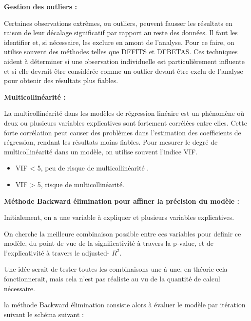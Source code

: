 \documentclass[
  letterpaper,
  DIV=11,
  numbers=noendperiod]{scrartcl}
\begin{document}
\textbf{Gestion des outliers :}

Certaines observations extrêmes, ou outliers, peuvent fausser les
résultats en raison de leur décalage significatif par rapport au reste
des données. Il faut les identifier et, si nécessaire, les exclure en
amont de l'analyse. Pour ce faire, on utilise souvent des méthodes
telles que DFFITS et DFBETAS. Ces techniques aident à déterminer si une
observation individuelle est particulièrement influente et si elle
devrait être considérée comme un outlier devant être exclu de l'analyse
pour obtenir des résultats plus fiables.

\textbf{Multicollinéarité :}

La multicollinéarité dans les modèles de régression linéaire est un
phénomène où deux ou plusieurs variables explicatives sont fortement
corrélées entre elles. Cette forte corrélation peut causer des problèmes
dans l'estimation des coefficients de régression, rendant les résultats
moins fiables. Pour mesurer le degré de multicollinéarité dans un
modèle, on utilise souvent l'indice VIF.

\begin{itemize}
\item
  VIF \textless{} 5, peu de risque de multicollinéarité .
\item
  VIF \textgreater{} 5, risque de multicollinéarité.
\end{itemize}

\textbf{Méthode Backward élimination pour affiner la précision du modèle
:}

Initialement, on a une variable à expliquer et plusieurs variables
explicatives.

On cherche la meilleure combinaison possible entre ces variables pour
definir ce modèle, du point de vue de la significativité à travers la
p-value, et de l'explicativité à travers le adjusted- \(R^2\).

Une idée serait de tester toutes les combinaisons une à une, en théorie
cela fonctionnerait, mais cela n'est pas réaliste au vu de la quantité
de calcul nécessaire.

la méthode Backward élimination consiste alors à évaluer le modèle par
itération suivant le schéma suivant :
\end{document}
